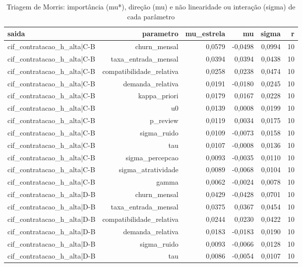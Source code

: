 \begin{table}[ht]
\centering
\caption{Triagem de Morris: importância (mu*), direção (mu) e não linearidade ou interação (sigma) de cada parâmetro}
\label{tab:morris}
\begin{tabular}{lrrrrr}
\hline
\textbf{saida} & \textbf{parametro} & \textbf{mu\_estrela} & \textbf{mu} & \textbf{sigma} & \textbf{r} \\
\hline
cif\_contratacao\_h\_alta|C-B & churn\_mensal & 0,0579 & -0,0498 & 0,0994 & 10 \\
cif\_contratacao\_h\_alta|C-B & taxa\_entrada\_mensal & 0,0394 & 0,0394 & 0,0438 & 10 \\
cif\_contratacao\_h\_alta|C-B & compatibilidade\_relativa & 0,0258 & 0,0238 & 0,0474 & 10 \\
cif\_contratacao\_h\_alta|C-B & demanda\_relativa & 0,0191 & -0,0180 & 0,0245 & 10 \\
cif\_contratacao\_h\_alta|C-B & kappa\_priori & 0,0179 & 0,0167 & 0,0228 & 10 \\
cif\_contratacao\_h\_alta|C-B & u0 & 0,0139 & 0,0008 & 0,0199 & 10 \\
cif\_contratacao\_h\_alta|C-B & p\_review & 0,0119 & 0,0034 & 0,0175 & 10 \\
cif\_contratacao\_h\_alta|C-B & sigma\_ruido & 0,0109 & -0,0073 & 0,0158 & 10 \\
cif\_contratacao\_h\_alta|C-B & tau & 0,0107 & -0,0008 & 0,0136 & 10 \\
cif\_contratacao\_h\_alta|C-B & sigma\_percepcao & 0,0093 & -0,0035 & 0,0110 & 10 \\
cif\_contratacao\_h\_alta|C-B & sigma\_atratividade & 0,0089 & -0,0068 & 0,0104 & 10 \\
cif\_contratacao\_h\_alta|C-B & gamma & 0,0062 & -0,0024 & 0,0078 & 10 \\
cif\_contratacao\_h\_alta|D-B & churn\_mensal & 0,0429 & -0,0428 & 0,0701 & 10 \\
cif\_contratacao\_h\_alta|D-B & taxa\_entrada\_mensal & 0,0375 & 0,0367 & 0,0454 & 10 \\
cif\_contratacao\_h\_alta|D-B & compatibilidade\_relativa & 0,0244 & 0,0230 & 0,0422 & 10 \\
cif\_contratacao\_h\_alta|D-B & demanda\_relativa & 0,0183 & -0,0183 & 0,0190 & 10 \\
cif\_contratacao\_h\_alta|D-B & sigma\_ruido & 0,0093 & -0,0066 & 0,0128 & 10 \\
cif\_contratacao\_h\_alta|D-B & tau & 0,0086 & -0,0054 & 0,0107 & 10 \\

\end{tabular}
\end{table}
